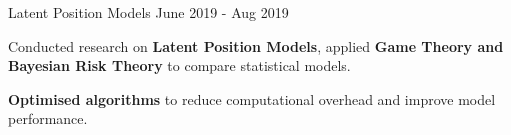 \begin{cvprojectentries}
  \cvprojectentry
    {Latent Position Models} %
    {June 2019 - Aug 2019} %
    {
        \begin{cvitems}
        \item {Conducted research on \textbf{Latent Position Models}, applied \textbf{Game Theory and Bayesian Risk Theory} to compare statistical models.}
        \item {\textbf{Optimised algorithms} to reduce computational overhead and improve model performance.}
        \end{cvitems}
    }



\end{cvprojectentries}